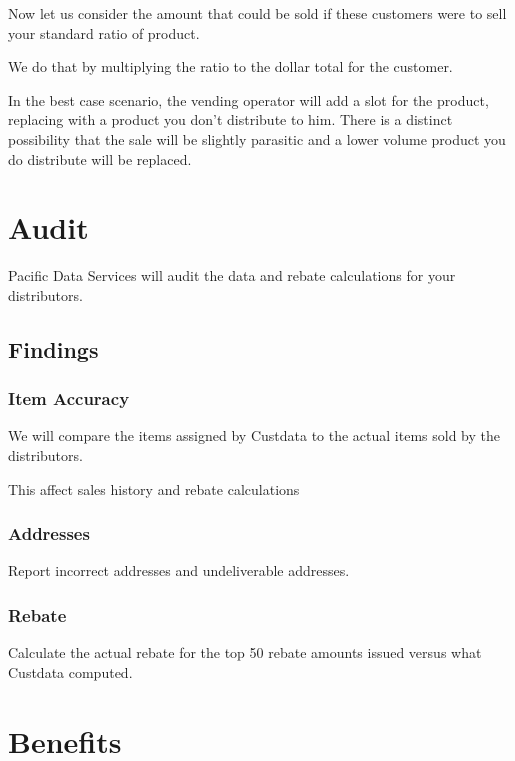 \documentclass[letterpaper,10pt,english]{sphinxmanual}
\begin{document}
Now let us consider the amount that could be sold if these customers were to sell
your standard ratio of product.

We do that by multiplying the ratio to the dollar total for the customer.

In the best case scenario, the vending operator will add a slot for the product, replacing
with a product you don’t distribute to him.  There is a distinct possibility that the sale
will be slightly parasitic and a lower volume product you do distribute will be replaced.


\section{Audit}
\label{\detokenize{Audit:audit}}\label{\detokenize{Audit::doc}}
Pacific Data Services will audit the data and rebate calculations for your distributors.


\subsection{Findings}
\label{\detokenize{Audit:findings}}

\subsubsection{Item Accuracy}
\label{\detokenize{Audit:item-accuracy}}
We will compare the items assigned by Custdata to the actual items sold by the distributors.

This affect sales history and rebate calculations


\subsubsection{Addresses}
\label{\detokenize{Audit:addresses}}
Report incorrect addresses and undeliverable addresses.


\subsubsection{Rebate}
\label{\detokenize{Audit:rebate}}
Calculate the actual rebate for the top 50 rebate amounts issued versus what Custdata
computed.


\section{Benefits}
\label{\detokenize{Benefits:benefits}}\label{\detokenize{Benefits::doc}}
\end{document}
